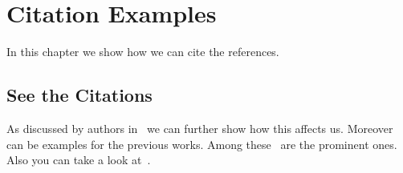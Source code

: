\chapter{Citation Examples}\label{ch:citations}

In this chapter we show how we can cite the references.


\section{See the Citations}
\label{sec:cite}

As discussed by authors
in~\cite{akbar2006solving,karim2015comograd,alam2012diversity} we can
further show how this affects
us. Moreover~\cite{kaykobad1987nonnegative,kaykobad1985positive,kaykobad19983,MCNC,guo2001floorplanning,holland1975as,aickelin2005artificial,al2010artificial}
can be examples for the previous works. Among
these~\cite{aickelin2005artificial,faruque2016modelling,durocher2015graphs,rahman2016absent,hashem2013countering,farhad2016mapping,malek2016balanced}
are the prominent ones. Also you can take a look
at~\cite{bashir2016learning,uddin2014citizen,kamal2016boosting,haque2013constructing,mukta2016identifying,ali2016spatial,islam2009new,al2010stable}.


\endinput



